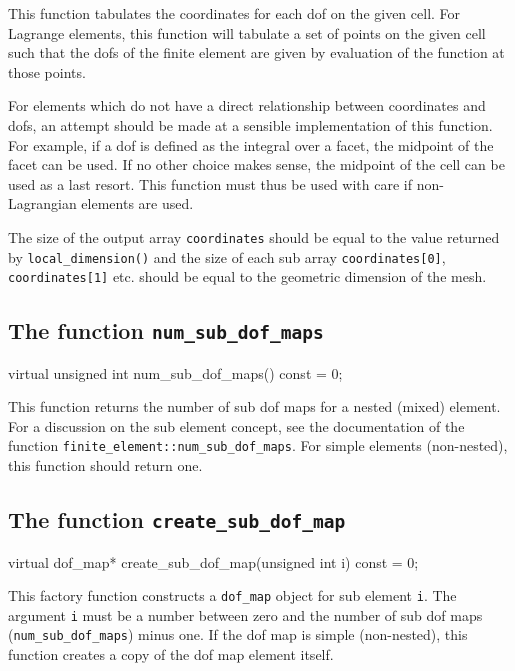 This function tabulates the coordinates for each dof on the given
cell. For Lagrange elements, this function will tabulate a set of
points on the given cell such that the dofs of the finite element are
given by evaluation of the function at those points.

For elements which do not have a direct relationship between
coordinates and dofs, an attempt should be made at a sensible
implementation of this function. For example, if a dof is defined as
the integral over a facet, the midpoint of the facet can be used. If
no other choice makes sense, the midpoint of the cell can be used as a
last resort. This function must thus be used with care if
non-Lagrangian elements are used. 

The size of the output array \texttt{coordinates} should be equal to
the value returned by \texttt{local\_dimension()} and the size of each
sub array \texttt{coordinates[0]}, \texttt{coordinates[1]} etc. should
be equal to the geometric dimension of the mesh.

\subsection{The function \texttt{num\_sub\_dof\_maps}}

\begin{code}
virtual unsigned int num_sub_dof_maps() const = 0;
\end{code}

This function returns the number of sub dof maps for a nested (mixed)
element. For a discussion on the sub element concept, see the
documentation of the function
\texttt{finite\_element::num\_sub\_dof\_maps}. For simple elements
(non-nested), this function should return one.

\subsection{The function \texttt{create\_sub\_dof\_map}}

\begin{code}
virtual dof_map* create_sub_dof_map(unsigned int i) const = 0;
\end{code}

This factory function constructs a \texttt{dof\_map} object for sub
element \texttt{i}. The argument \texttt{i} must be a number between
zero and the number of sub dof maps (\texttt{num\_sub\_dof\_maps})
minus one. If the dof map is simple (non-nested), this function creates a
copy of the dof map element itself.

